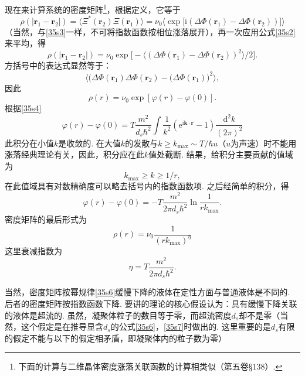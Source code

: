 现在来计算系统的密度矩阵\footnote{下面的计算与二维晶体密度涨落关联函数的计算相类似（第五卷§138）.}，根据定义，它等于
\begin{equation*}
\rho(|\bm{r}_{1}-\bm{r}_{2}|)
=\langle\Xi^{*}(\bm{r}_{2})\Xi(\bm{r}_{1})\rangle
=\nu_{0}\big\langle\exp\big[\mathrm{i}(\Delta\Phi(\bm{r}_{1})-\Delta\Phi(\bm{r}_{2}))\big]\big\rangle
\end{equation*}
（当然，与\eqref{35s3}一样，不可将指数函数按相位涨落展开），再一次应用公式\eqref{35s2}来平均，得
\begin{equation*}
\rho(|\bm{r}_{1}-\bm{r}_{2}|)
=\nu_{0}\exp\big[-\langle(\Delta\Phi(\bm{r}_{1})-\Delta\Phi(\bm{r}_{2}))^{2}\rangle/2\big].
\end{equation*}
方括号中的表达式显然等于：
\begin{equation*}
\big\langle\big(\Delta\Phi(\bm{r}_{1})\Delta\Phi(\bm{r}_{2})
-\big(\Delta\Phi(\bm{r}_{1})\big)^{2}\big\rangle,
\end{equation*}
因此
\begin{equation*}
\rho(r)=\nu_{0}\exp[\varphi(r)-\varphi(0)].
\end{equation*}
根据\eqref{35s4}
\begin{equation*}
\varphi(r)-\varphi(0)=T\frac{m^{2}}{d_{s}\hbar^{2}}\int\frac{1}{k^{2}}
(\mathrm{e}^{\mathrm{i}\bm{k}\cdot\bm{r}}-1)\frac{\mathrm{d}^{2}k}{(2\pi)^{2}}
\tag{35*.5}
\label{35s5}
\end{equation*}
此积分在小值$k$是收敛的. 在大值$k$的发散与$k\geqslant k_{\max}\sim T/\hbar u$（$u$为声速）时不能用涨落经典理论有关，因此，积分应在此$k$值处截断. 结果，给积分主要贡献的值域为
\begin{equation*}
k_{\max}\geqslant k\geqslant1/r,
\end{equation*}
在此值域具有对数精确度可以略去括号内的指数函数项. 之后经简单的积分，得
\begin{equation*}
\varphi(r)-\varphi(0)=-T\frac{m^{2}}{2\pi d_{s}\hbar^{2}}\ln\frac{1}{rk_{\max}}.
\end{equation*}
密度矩阵的最后形式为
\begin{equation*}
\rho(r)=\nu_{0}\frac{1}{(rk_{\max})^{\eta}}
\tag{35*.6}
\label{35s6}
\end{equation*}
这里衰减指数为
\begin{equation*}
\eta=T\frac{m^{2}}{2\pi d_{s}\hbar^{2}}.
\tag{35*.7}
\label{35s7}
\end{equation*}

当然，密度矩阵按幂规律\eqref{35s6}缓慢下降的液体在定性方面与普通液体是不同的. 后者的密度矩阵按指数函数下降. 要讲的理论的核心假设认为：具有缓慢下降关联的液体是超流的. 虽然，凝聚体粒子的数目等于零，而超流密度$d_{s}$却不是零（当然，这个假定是在推导显含$d_{s}$的公式\eqref{35s6}，\eqref{35s7}时做出的. 这里重要的是$d_{s}$有限的假定不能与以下的假定相矛盾，即凝聚体内的粒子数为零）

